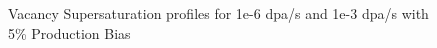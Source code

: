 \documentclass[a4paper]{article}
\begin{document}
      \begin{figure}[h!]  %
        \centering
        \qquad
        \caption{Vacancy Supersaturation profiles for 1e-6 dpa/s and 1e-3 dpa/s with 5\% Production Bias}
        \label{figure:5}
      \end{figure}
\end{document}
